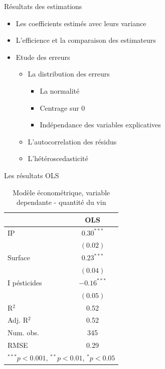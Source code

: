 \documentclass[11pt,ignorenonframetext,]{beamer}
\providecommand{\tightlist}{%
  \setlength{\itemsep}{0pt}\setlength{\parskip}{0pt}}
\begin{document}
\begin{frame}{Résultats des estimations}
\protect\hypertarget{resultats-des-estimations}{}

\begin{itemize}
\tightlist
\item
  Les coefficients estimés avec leurs variance
\item
  L'efficience et la comparaison des estimateurs
\item
  Etude des erreurs

  \begin{itemize}
  \tightlist
  \item
    La distribution des erreurs

    \begin{itemize}
    \tightlist
    \item
      La normalité
    \item
      Centrage sur 0
    \item
      Indépendance des variables explicatives
    \end{itemize}
  \item
    L'autocorrelation des résidus
  \item
    L'hétéroscedasticité
  \end{itemize}
\end{itemize}

\end{frame}

\begin{frame}{Les résultats OLS}
\protect\hypertarget{les-resultats-ols}{}

\tiny

\begin{table}
\begin{center}
\begin{tabular}{l c }
\hline
 & OLS \\
\hline
IP           & $0.30^{***}$  \\
             & $(0.02)$      \\
Surface      & $0.23^{***}$  \\
             & $(0.04)$      \\
I pésticides & $-0.16^{***}$ \\
             & $(0.05)$      \\
\hline
R$^2$        & 0.52          \\
Adj. R$^2$   & 0.52          \\
Num. obs.    & 345           \\
RMSE         & 0.29          \\
\hline
\multicolumn{2}{l}{\scriptsize{$^{***}p<0.001$, $^{**}p<0.01$, $^*p<0.05$}}
\end{tabular}
\caption{Modèle économétrique, variable dependante - quantité du vin}
\label{table : ols}
\end{center}
\end{table}

\normalsize

\end{frame}
\end{document}
